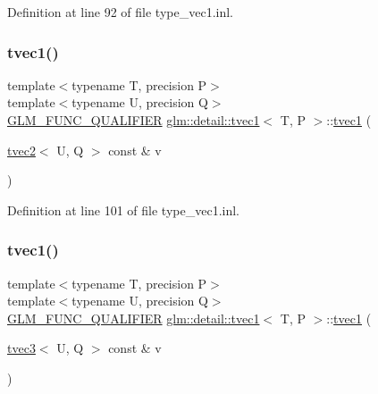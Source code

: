 Definition at line 92 of file type\+\_\+vec1.\+inl.

\mbox{\label{structglm_1_1detail_1_1tvec1_a83c61bae71b14ac2cba715eee715dea7}} 
\subsubsection{\texorpdfstring{tvec1()}{tvec1()}\hspace{0.1cm}{\footnotesize\ttfamily [12/14]}}
{\footnotesize\ttfamily template$<$typename T, precision P$>$ \\
template$<$typename U, precision Q$>$ \\
\hyperlink{setup_8hpp_a33fdea6f91c5f834105f7415e2a64407}{G\+L\+M\+\_\+\+F\+U\+N\+C\+\_\+\+Q\+U\+A\+L\+I\+F\+I\+ER} \hyperlink{structglm_1_1detail_1_1tvec1}{glm\+::detail\+::tvec1}$<$ T, P $>$\+::\hyperlink{structglm_1_1detail_1_1tvec1}{tvec1} (\begin{DoxyParamCaption}\item[{\hyperlink{structglm_1_1detail_1_1tvec2}{tvec2}$<$ U, Q $>$ const \&}]{v }\end{DoxyParamCaption})}



Definition at line 101 of file type\+\_\+vec1.\+inl.

\mbox{\label{structglm_1_1detail_1_1tvec1_a3c252050abfe0ec01b6ff89566883d8f}} 
\subsubsection{\texorpdfstring{tvec1()}{tvec1()}\hspace{0.1cm}{\footnotesize\ttfamily [13/14]}}
{\footnotesize\ttfamily template$<$typename T, precision P$>$ \\
template$<$typename U, precision Q$>$ \\
\hyperlink{setup_8hpp_a33fdea6f91c5f834105f7415e2a64407}{G\+L\+M\+\_\+\+F\+U\+N\+C\+\_\+\+Q\+U\+A\+L\+I\+F\+I\+ER} \hyperlink{structglm_1_1detail_1_1tvec1}{glm\+::detail\+::tvec1}$<$ T, P $>$\+::\hyperlink{structglm_1_1detail_1_1tvec1}{tvec1} (\begin{DoxyParamCaption}\item[{\hyperlink{structglm_1_1detail_1_1tvec3}{tvec3}$<$ U, Q $>$ const \&}]{v }\end{DoxyParamCaption})}



